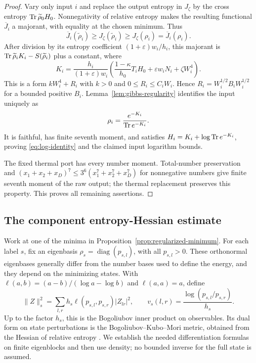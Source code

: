 \begin{proof}
Vary only input $i$ and replace the output entropy in $J_\zeta$ by
the cross entropy $\operatorname{Tr}\widetilde\rho_0H_0$. Nonnegativity of relative
entropy makes the resulting functional $\overline J_i$ a majorant,
with equality at the chosen minimum. Thus
\[
 \overline J_i(\widetilde\rho_i)
 \ge J_\zeta(\widetilde\rho_i)
 \ge J_\zeta(\rho_i)=\overline J_i(\rho_i).
\]
After division by its entropy coefficient
$(1+\varepsilon)w_i/h_i$, this majorant is
$\operatorname{Tr}\widetilde\rho_iK_i-S(\widetilde\rho_i)$ plus a constant, where
\begin{equation}\label{eq:gibbs-hamiltonian}
 K_i=\frac{h_i}{(1+\varepsilon)w_i}
 \left(\frac{1-\kappa}{h_0}T_iH_0
       +\varepsilon w_iN_i+\zeta W_i^4\right).
\end{equation}
This is a form $kW_i^4+R_i$ with $k>0$ and
$0\le R_i\le C_iW_i$. Hence
$R_i=W_i^{1/2}B_iW_i^{1/2}$ for a bounded positive $B_i$.
Lemma~\ref{lem:gibbs-regularity} identifies the input uniquely as
\[
 \rho_i=\frac{e^{-K_i}}{\operatorname{Tr} e^{-K_i}}.
\]
It is faithful, has finite seventh moment, and satisfies
$H_i=K_i+\log\operatorname{Tr} e^{-K_i}$, proving \eqref{eq:log-identity} and the
claimed input logarithm bounds.

The fixed thermal port has every number moment. Total-number
preservation and
$(x_1+x_2+x_D)^7\le3^6(x_1^7+x_2^7+x_D^7)$ for nonnegative numbers
give finite seventh moment of the raw output; the thermal replacement
preserves this property. This proves all remaining assertions.
\end{proof}

\subsection{The component entropy-Hessian estimate}

Work at one of the minima in Proposition~\ref{prop:regularized-minimum}.
For each label $s$, fix an eigenbasis
$\rho_s=\operatorname{diag}(p_{s,l})$, with all $p_{s,l}>0$. These orthonormal eigenbases generally differ from the number bases used to define the energy, and they depend on the minimizing states. With
$\ell(a,b)=(a-b)/(\log a-\log b)$ and $\ell(a,a)=a$, define
\begin{equation}\label{eq:logmean-metric}
 \|Z\|_s^2
   =\sum_{l,r}h_s\ell(p_{s,l},p_{s,r})|Z_{lr}|^2,
 \qquad
 v_s(l,r)=\frac{\log(p_{s,l}/p_{s,r})}{h_s}.
\end{equation}
Up to the factor $h_s$, this is the Bogoliubov inner product on
observables. Its dual form on state perturbations is the
Bogoliubov--Kubo--Mori metric, obtained from the Hessian of relative
entropy \cite{PetzToth1993,LesniewskiRuskai1999}. We establish the needed
differentiation formulas on finite eigenblocks and then use density;
no bounded inverse for the full state is assumed.


